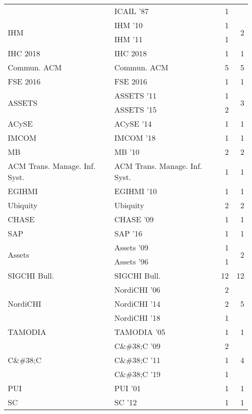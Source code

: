 \begin{table*}[t]
\begin{tabular}{llrr}
& ICAIL '87 & 1 &\\
\multirow{2}{*}{IHM } & IHM '10 & 1 & \multirow{2}{*}{2}\\
& IHM '11 & 1 &\\
\multirow{1}{*}{IHC 2018} & IHC 2018 & 1 & \multirow{1}{*}{1}\\
\multirow{1}{*}{Commun. ACM} & Commun. ACM & 5 & \multirow{1}{*}{5}\\
\multirow{1}{*}{FSE 2016} & FSE 2016 & 1 & \multirow{1}{*}{1}\\
\multirow{2}{*}{ASSETS } & ASSETS '11 & 1 & \multirow{2}{*}{3}\\
& ASSETS '15 & 2 &\\
\multirow{1}{*}{ACySE } & ACySE '14 & 1 & \multirow{1}{*}{1}\\
\multirow{1}{*}{IMCOM } & IMCOM '18 & 1 & \multirow{1}{*}{1}\\
\multirow{1}{*}{MB } & MB '10 & 2 & \multirow{1}{*}{2}\\
\multirow{1}{*}{ACM Trans. Manage. Inf. Syst.} & ACM Trans. Manage. Inf. Syst. & 1 & \multirow{1}{*}{1}\\
\multirow{1}{*}{EGIHMI } & EGIHMI '10 & 1 & \multirow{1}{*}{1}\\
\multirow{1}{*}{Ubiquity} & Ubiquity & 2 & \multirow{1}{*}{2}\\
\multirow{1}{*}{CHASE } & CHASE '09 & 1 & \multirow{1}{*}{1}\\
\multirow{1}{*}{SAP } & SAP '16 & 1 & \multirow{1}{*}{1}\\
\multirow{2}{*}{Assets } & Assets '09 & 1 & \multirow{2}{*}{2}\\
& Assets '96 & 1 &\\
\multirow{1}{*}{SIGCHI Bull.} & SIGCHI Bull. & 12 & \multirow{1}{*}{12}\\
\multirow{3}{*}{NordiCHI } & NordiCHI '06 & 2 & \multirow{3}{*}{5}\\
& NordiCHI '14 & 2 &\\
& NordiCHI '18 & 1 &\\
\multirow{1}{*}{TAMODIA } & TAMODIA '05 & 1 & \multirow{1}{*}{1}\\
\multirow{3}{*}{C\&\#38;C } & C\&\#38;C '09 & 2 & \multirow{3}{*}{4}\\
& C\&\#38;C '11 & 1 &\\
& C\&\#38;C '19 & 1 &\\
\multirow{1}{*}{PUI } & PUI '01 & 1 & \multirow{1}{*}{1}\\
\multirow{1}{*}{SC } & SC '12 & 1 & \multirow{1}{*}{1}\\

\end{tabular}
\end{table*}
